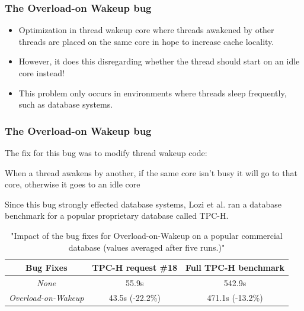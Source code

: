 \documentclass{beamer}
\newcommand{\linespace}{\vskip 0.25cm}
\begin{document}
\begin{frame}
\frametitle{The Overload-on Wakeup bug}
\begin{itemize}
\item Optimization in thread wakeup core where threads awakened by other threads are placed on the same core in hope to increase cache locality.

\linespace

\item However, it does this disregarding whether the thread should start on an idle core instead!	
\end{itemize}

\linespace

\begin{itemize}
\item This problem only occurs in environments where threads sleep frequently, such as database systems.
\end{itemize}

\end{frame}


\begin{frame}
\frametitle{The Overload-on Wakeup bug}
The fix for this bug was to modify thread wakeup code:
\linespace

When a thread awakens by another, if the same core isn't busy it will go to that core, otherwise it goes to an idle core

\linespace

Since this bug strongly effected database systems, Lozi et al. ran a database benchmark for a popular proprietary database called TPC-H.

\begin{table}
	\centering
	\begin{tabular}{| c | c | c |}
		\hline			
	  	Bug Fixes & TPC-H request \#18 & Full TPC-H benchmark \\ \hline
		\emph{None} & 55.9s & 542.9s \\ \hline
		\emph{Overload-on-Wakeup} & 43.5s (-22.2\%) & 471.1s (-13.2\%) \\
		\hline
	\end{tabular}
	\caption{"Impact of the bug fixes for Overload-on-Wakeup on a popular commercial database (values averaged after five runs.)"}
\end{table}

\end{frame}

\end{document}
